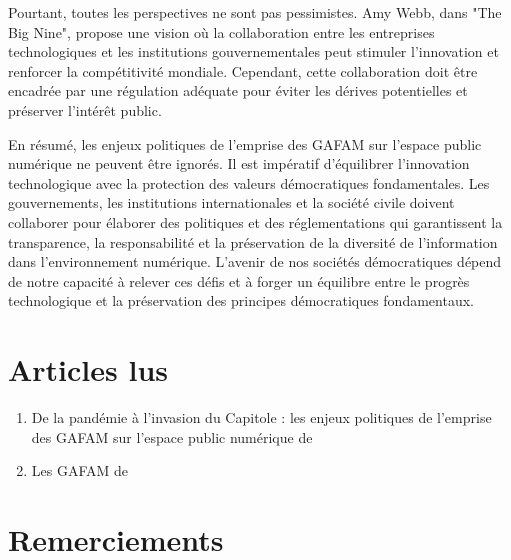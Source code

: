 \documentclass[12pt,a4paper]{article} %
\begin{document}
    Pourtant, toutes les perspectives ne sont pas pessimistes. Amy Webb, dans "The Big Nine", propose une vision où la collaboration entre les entreprises technologiques et les institutions gouvernementales peut stimuler l'innovation et renforcer la compétitivité mondiale. Cependant, cette collaboration doit être encadrée par une régulation adéquate pour éviter les dérives potentielles et préserver l'intérêt public. 
    
    En résumé, les enjeux politiques de l'emprise des GAFAM sur l'espace public numérique ne peuvent être ignorés. Il est impératif d'équilibrer l'innovation technologique avec la protection des valeurs démocratiques fondamentales. Les gouvernements, les institutions internationales et la société civile doivent collaborer pour élaborer des politiques et des réglementations qui garantissent la transparence, la responsabilité et la préservation de la diversité de l'information dans l'environnement numérique. L'avenir de nos sociétés démocratiques dépend de notre capacité à relever ces défis et à forger un équilibre entre le progrès technologique et la préservation des principes démocratiques fondamentaux.
    
    	\section{Articles lus}
    \begin{enumerate}
    	\item De la pandémie à l’invasion du Capitole : les enjeux politiques de l’emprise des GAFAM sur l’espace public numérique de \cite{Smyrnaios2021}
    	\item Les GAFAM de \cite{SushchevaNatalia2018}
    \end{enumerate}
    
    \section{Remerciements}
    
    
	\printbibliography
\end{document}
